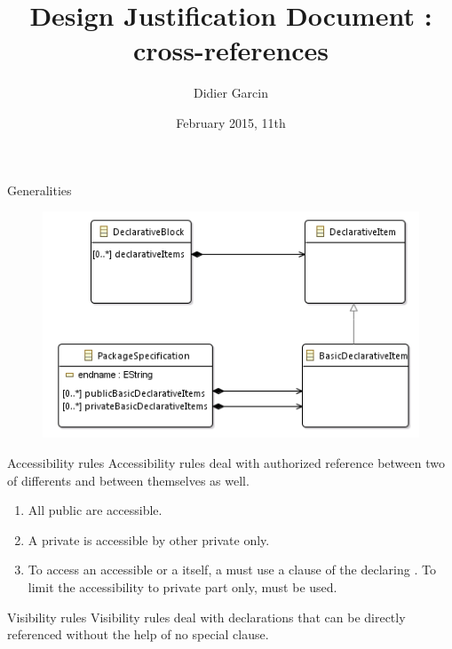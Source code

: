 \documentclass[a4paper]{prjdoc}
\title{Design Justification Document : cross-references}
\author {Didier Garcin}
\date{February 2015, 11th}
\begin{document}
\maketitle

  \begin{asection}{Generalities}
     
     \begin{figure}\label{fig:DeclarativeItems}
     \includegraphics[scale=1]{"../../model/Declarative Items"}
     \end{figure} 
     
     \begin{asection}{Accessibility rules}
     \label{sec:Accessibility rules}
     Accessibility rules deal with authorized reference between two  of differents  
     and between themselves as well. 
        \begin{enumerate}   
        \item All public are accessible.
        \item A private is accessible by other private  only.
        \item To access an accessible  or a  itself, 
              a must use a  clause of the declaring
              . To limit the accessibility to private part only,  must be used.
        \end{enumerate}
     \end{asection} %
      

     \begin{asection} {Visibility rules} 
     \label{sec:Visibility rules}             
     Visibility rules deal with declarations that can be directly referenced without the help of no special clause.
      

\end{asection}
\end{asection}
\end{document}
